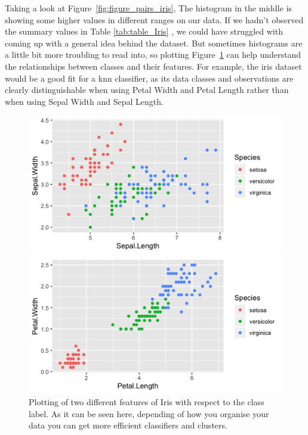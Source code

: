 Taking a look at Figure~\ref{fig:figure_pairs_iris}, The histogram in the middle is showing some higher values in different ranges on our data. If we hadn't observed the summary values in Table \ref{tab:table_Iris} , we could have struggled with coming up with a general idea behind the dataset. But sometimes histograms are a little bit more troubling to read into, so plotting Figure~\ref{fig:figure_knn_classifier} can help understand the relationships between classes and their features. For example, the iris dataset would be a good fit for a knn classifier, as its data classes and observations are clearly distinguishable when using Petal Width and Petal Length rather than when using Sepal Width and Sepal Length. 
%
\begin{figure}[H]
\begin{minipage}{.5\textwidth}
        \includegraphics[scale=.54]{Figuras_tfg/R_plot_iris_knn_width_sepal}
 \end{minipage}%
 \begin{minipage}{.5\textwidth}
        \begin{flushright}
               \includegraphics[scale=.54]{Figuras_tfg/R_plot_knn_petal}  
        \end{flushright} 
    \end{minipage}  
  \caption{Plotting of two different features of Iris with respect to the class label. As it can be seen here, depending of how you organise your data you can get more efficient classifiers and clusters. }
 \label{fig:figure_knn_classifier}
\end{figure} 

